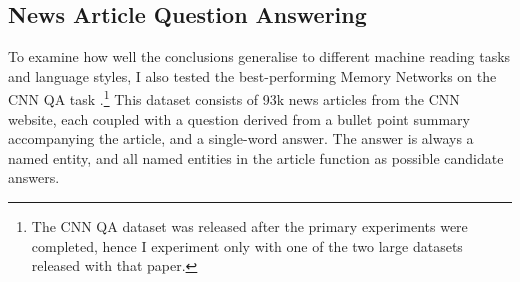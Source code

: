 \fi
	




\begin{table}[ht]
  \begin{center}
   \label{tab:qacnn_res}
    \resizebox{1\linewidth}{!}{
      {\sc 
        \begin{tabular}{l|cc}
          Methods & Validation & Test \\
          \hline
          \hline
          Maximum frequency (article)$^{(*)}$ & 0.305 & 0.332 \\
          Sliding window & 0.005 & 0.006 \\
          Word distance model$^{(*)}$ & 0.505 & 0.509 \\
          \hline 
          Deep LSTMs (article+query)$^{(*)}$ & 0.550 & 0.570 \\
          Contextual LSTMs (``Attentive reader'')$^{(*)}$ & 0.616 & 0.630 \\
          Contextual LSTMs (``Impatient reader'')$^{(*)}$ & 0.618 & 0.638 \\
          \hline
          MemNNs (window memory) & 0.580 & 0.606 \\
          MemNNs (window memory + self-sup.) & 0.634 & 0.668 \\
          \hline
          MemNNs (window memory + ensemble) & 0.612 & 0.638 \\ 
          MemNNs (window memory + self-sup.  + ensemble) & 0.649 & 0.684 \\
          \hline
          MemNNs (window  + self-sup.  +  ensemble + exclud. coocurrences) & \bf 0.662 & \bf 0.694 \\
          \hline
        \end{tabular}
      }
    }
    \caption{\label{tab:qacnn_res} {\bf Results on CNN QA.} $^{(*)}$Results taken from \cite{nips15_hermann}.}\label{cnn}
  \end{center}
  \vspace*{-2ex}
\end{table}


\subsection{News Article Question Answering}
To examine how well the conclusions generalise to different machine
reading tasks and language styles, I also tested the
best-performing Memory Networks on the CNN QA task \citep{nips15_hermann}.\footnote{The CNN QA dataset was released after the primary experiments were completed, hence I experiment only with one of the two large datasets released with that paper.} This dataset consists of 93k news articles from the CNN website, each coupled with a question derived from a bullet point summary accompanying the article, and a single-word answer. The answer is always a named entity, and all named entities in the article function as possible candidate answers.

